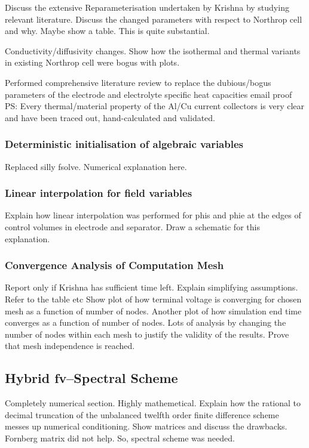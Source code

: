 Discuss the extensive Reparameterisation undertaken by Krishna by studying
relevant literature. Discuss the changed parameters with respect to Northrop
cell and why. Maybe show a table. This is quite substantial.

Conductivity/diffusivity changes. Show how the isothermal and thermal variants
in existing Northrop cell were bogus with plots.

Performed comprehensive literature review to replace the dubious/bogus
parameters of the electrode and electrolyte specific heat capacities email proof
PS: Every thermal/material property of the Al/Cu current collectors is very
clear and have been traced out, hand-calculated and validated.

\subsubsection{Deterministic initialisation of algebraic variables}

Replaced silly fsolve. Numerical explanation here.

\subsubsection{Linear interpolation for field variables}

Explain how linear interpolation was performed for phis and phie at the edges
of control volumes in electrode and separator. Draw a schematic for this
explanation.

\subsubsection*{Convergence Analysis of Computation Mesh}
Report only if Krishna has sufficient time left. Explain simplifying
assumptions. Refer to the table etc Show plot of how terminal voltage is
converging for chosen mesh as a function of number of nodes. Another plot of how
simulation end time converges as a function of number of nodes. Lots of analysis
by changing the number of nodes within each mesh to justify the validity of the
results. Prove that mesh independence is reached.

\subsection{Hybrid fv--Spectral Scheme}

Completely numerical section. Highly mathemetical. Explain how the rational to
decimal truncation of the unbalanced twelfth order finite difference scheme
messes up numerical conditioning. Show matrices and discuss the drawbacks.
Fornberg matrix did not help. So, spectral scheme was needed.

